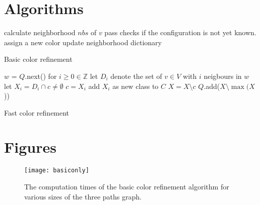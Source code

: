 \documentclass[twoside]{article}
\begin{document}
\begin{appendices}
\label{app}

\section{Algorithms}
\label{app:algs}
\begin{algorithm}
    \begin{algorithmic}[1] %
             
            	 	\State calculate neighborhood $nbs$ of $v$
    \State pass
    				\Else
    						\State checks if the configuration is not yet known.
    					\EndFor
    						\State assign a new color
    					\EndIf
    				\EndIf
            	  \EndFor
					\State update neighborhood dictionary
				\EndFor
            \EndWhile
        \EndProcedure {}
    \end{algorithmic}
    \caption{Basic color refinement}
    \label{alg:basic}
\end{algorithm}

\begin{algorithm}
    \begin{algorithmic}[1]
    			\State $w$ = $Q$.next()
    			\State for $i \geq 0 \in \mathbb{Z}$ let $D_i$ denote the set of $v \in V$ with $i$ neigbours in $w$ 
    				\State let $X_i = D_i \cap c \neq \emptyset$
    						\State $c = X_i$
    					\Else
    						\State add $X_i$ as new class to $C$
    					\EndIf    					
    				\EndFor
    				\State $X = X \setminus c$
    			\EndIf
    			\State $Q$.add($X \setminus \max (X$))
    			\EndFor 			
    			
    		\EndWhile 
        \EndProcedure
    \end{algorithmic}
    \caption{Fast color refinement}
\end{algorithm}

\section{Figures}
\label{app:figs}
\begin{multicols}{2}
\begin{figure}[H]
	\texttt{[image: basiconly]}
	\caption{The computation times of the basic color refinement algorithm for various sizes of the three paths graph.}
	\label{fig:basiconly}
\end{figure}


\end{multicols}
\end{appendices}
\end{document}
